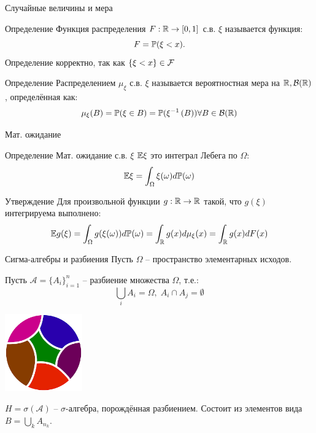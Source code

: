 \documentclass{beamer}
\begin{document}
\begin{frame}{Случайные величины и мера}
    \begin{block}{Определение}
        Функция распределения $F: \mathbb{R}\to[0, 1]$ с.в. $\xi$ называется функция:
        $$
            F = \mathbb{P}(\xi < x).
        $$Определение корректно, так как $\{\xi < x\} \in \mathcal{F}$
    \end{block}
    \begin{block}{Определение}
        Распределением $\mu_{\xi}$ с.в. $\xi$ называется вероятностная мера на $\mathbb{R}, \mathcal{B}(\mathbb{R})$, определённая как:
        $$
            \mu_{\xi}(B) = \mathbb{P}(\xi \in B) = \mathbb{P}(\xi^{-1}\left( B \right)) \forall B\in\mathcal{B}(\mathbb{R})
        $$
    \end{block}
\end{frame}

\begin{frame}{Мат. ожидание} 
    \begin{block}{Определение}
    Мат. ожидание с.в. $\xi$ $\mathbb{E} \xi$ это интеграл Лебега по $\Omega$:
        $$
            \mathbb{E} \xi = \int_{\Omega}\xi(\omega)d\mathbb{P}(\omega)
        $$
    \end{block}
    \begin{block}{Утверждение}
        Для произвольной функции $g : \mathbb{R} \to \mathbb{R}$ такой, что $g(\xi)$ интегрируема выполнено:
        $$
            \mathbb{E} g(\xi) = \int_{\Omega} g(\xi(\omega))d\mathbb{P}(\omega)=\int_{\mathbb{R}} g(x) d\mu_{\xi}(x) = 
            \int_{\mathbb{R}} g(x) dF(x)
        $$
    \end{block}
\end{frame}

\begin{frame}{Сигма-алгебры и разбиения}
    Пусть $\Omega$ -- пространство элементарных исходов.
    
    Пусть $\mathcal{A} = \{A_i\}_{i=1}^n$ -- разбиение множества $\Omega$, т.е.:
    $$\bigcup_i A_i = \Omega, \; A_i \cap A_j = \emptyset$$

    \begin{center}
        \includegraphics[width=0.25\textwidth]{8_figs/разбиение.png}
    \end{center}

    $H = \sigma(\mathcal{A})$ -- $\sigma$-алгебра, порождённая разбиением. Состоит из элементов вида 
    $B = \bigcup_{k} A_{n_k}$.
\end{frame}
\end{document}
